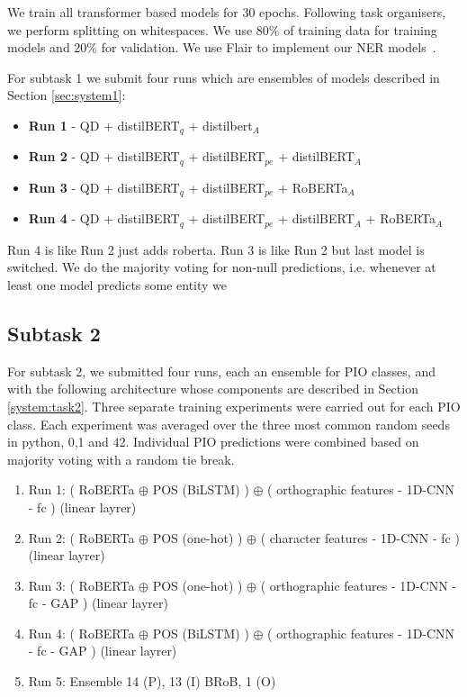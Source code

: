 \documentclass[11pt]{article}
\begin{document}
We train all transformer based models for 30 epochs. 
Following task organisers, we perform splitting on whitespaces.
We use 80\% of training data for training models and 20\% for validation.
We use Flair to implement our NER models~\cite{Akbik2019FLAIRAE}.

For subtask 1 we submit four runs which are ensembles of models described in Section \ref{sec:system1}:

\begin{itemize}
\item \textbf{Run 1} - QD + distilBERT$_q$ + distilbert$_A$
\item \textbf{Run 2} - QD + distilBERT$_q$ + distilBERT$_{pe}$ + distilBERT$_A$
\item \textbf{Run 3} - QD + distilBERT$_q$ + distilBERT$_{pe}$ + RoBERTa$_A$
\item \textbf{Run 4} - QD + distilBERT$_q$ + distilBERT$_{pe}$ + distilBERT$_A$ + RoBERTa$_A$ 
\end{itemize}

Run 4 is like Run 2 just adds roberta.
Run 3 is like Run 2 but last model is switched.
We do the majority voting for non-null predictions, i.e. whenever at least one model predicts some entity we 

%
%
%
\subsection{Subtask 2}
\label{exps:task2}
%
For subtask 2, we submitted four runs, each an ensemble for PIO classes, and with the following architecture whose components are described in Section \ref{system:task2}.
Three separate training experiments were carried out for each PIO class.
Each experiment was averaged over the three most common random seeds in python, 0,1 and 42.
Individual PIO predictions were combined based on majority voting with a random tie break.
%
\begin{enumerate}
    \item Run 1: ( RoBERTa $\oplus$ POS (BiLSTM) ) $\oplus$ ( orthographic features - 1D-CNN - fc  ) (linear layrer)
    \item Run 2: ( RoBERTa $\oplus$ POS (one-hot) ) $\oplus$ ( character features - 1D-CNN - fc  ) (linear layrer)
    \item Run 3: ( RoBERTa $\oplus$ POS (one-hot) ) $\oplus$ ( orthographic features - 1D-CNN - fc - GAP ) (linear layrer) 
    \item Run 4: ( RoBERTa $\oplus$ POS (BiLSTM) ) $\oplus$ ( orthographic features - 1D-CNN - fc - GAP ) (linear layrer) 
    \item Run 5: Ensemble 14 (P), 13 (I) BRoB, 1 (O)   
\end{enumerate}
%
%
%
\end{document}
